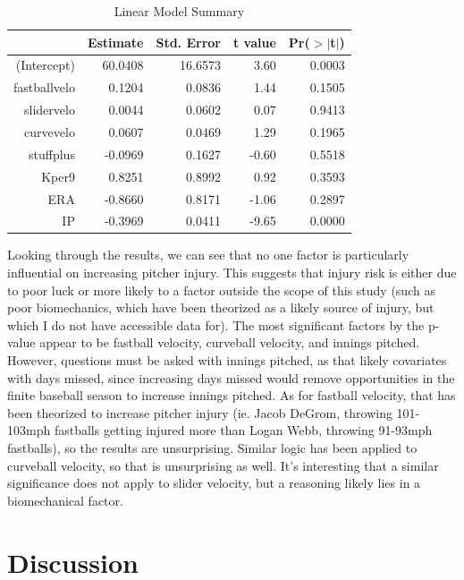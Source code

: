 \documentclass{article}
\begin{document}
\begin{table}[ht]
\centering
\begin{tabular}{rrrrr}
  \hline
 & Estimate & Std. Error & t value & Pr($>$$|$t$|$) \\ 
  \hline
(Intercept) & 60.0408 & 16.6573 & 3.60 & 0.0003 \\ 
  fastballvelo & 0.1204 & 0.0836 & 1.44 & 0.1505 \\ 
  slidervelo & 0.0044 & 0.0602 & 0.07 & 0.9413 \\ 
  curvevelo & 0.0607 & 0.0469 & 1.29 & 0.1965 \\ 
  stuffplus & -0.0969 & 0.1627 & -0.60 & 0.5518 \\ 
  Kper9 & 0.8251 & 0.8992 & 0.92 & 0.3593 \\ 
  ERA & -0.8660 & 0.8171 & -1.06 & 0.2897 \\ 
  IP & -0.3969 & 0.0411 & -9.65 & 0.0000 \\ 
   \hline
\end{tabular}
\caption{Linear Model Summary} 
\label{tab:lm_summary}
\end{table}

Looking through the results, we can see that no one factor is particularly influential on increasing pitcher injury. This suggests that injury risk is either due to poor luck or more likely to a factor outside the scope of this study (such as poor biomechanics, which have been theorized as a likely source of injury, but which I do not have accessible data for). The most significant factors by the p-value appear to be fastball velocity, curveball velocity, and innings pitched. However, questions must be asked with innings pitched, as that likely covariates with days missed, since increasing days missed would remove opportunities in the finite baseball season to increase innings pitched. As for fastball velocity, that has been theorized to increase pitcher injury (ie. Jacob DeGrom, throwing 101-103mph fastballs getting injured more than Logan Webb, throwing 91-93mph fastballs), so the results are unsurprising. Similar logic has been applied to curveball velocity, so that is unsurprising as well. It's interesting that a similar significance does not apply to slider velocity, but a reasoning likely lies in a biomechanical factor.

\section{Discussion}
\end{document}
